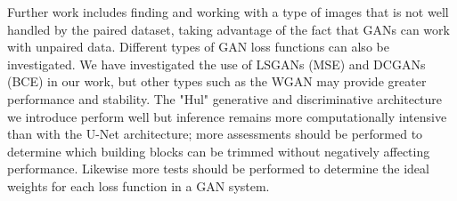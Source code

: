 Further work includes finding and working with a type of images that is not well handled by the paired dataset, taking advantage of the fact that \acp{GAN} can work with unpaired data. Different types of \ac{GAN} loss functions can also be investigated. We have investigated the use of \acp{LSGAN} (\ac{MSE}) and \acp{DCGAN} (\ac{BCE}) in our work, but other types such as the \ac{WGAN} may provide greater performance and stability. The "Hul" generative and discriminative architecture we introduce perform well but inference remains more computationally intensive than with the U-Net architecture; more assessments should be performed to determine which building blocks can be trimmed without negatively affecting performance. Likewise more tests should be performed to determine the ideal weights for each loss function in a \ac{GAN} system.






